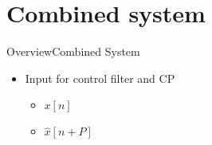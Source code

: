 \section{Combined system}
\begin{frame}{Overview}{Combined System}	
	\begin{itemize}
		\item Input for control filter and CP
		\begin{itemize}
			\item $x[n]$
			\item $\hat{x}[n+P]$
		\end{itemize}
	\end{itemize}
	\begin{center}
		\resizebox{0.9\columnwidth}{!}{		
			}
	\end{center}
\end{frame}


